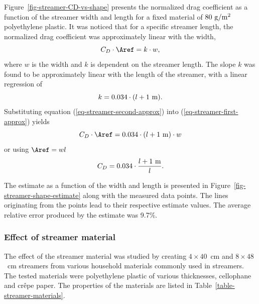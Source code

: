 Figure~\ref{fig-streamer-CD-vs-shape} presents the normalized drag
coefficient as a function of the streamer width and length for a fixed
material of $\rm80~g/m^2$ polyethylene plastic.  It was noticed that
for a specific streamer length, the normalized drag coefficient was
approximately linear with the width,
%
\begin{equation}
C_D \cdot \Aref = k\cdot w,
\label{eq-streamer-first-approx}
\end{equation}
%
where $w$ is the width and $k$ is dependent on the streamer length.
The slope $k$ was found to be approximately linear with
the length of the streamer, with a linear regression of
%
\begin{equation}
k = 0.034 \cdot (l+\rm 1~m).
\label{eq-streamer-second-approx}
\end{equation}
%
Substituting equation (\ref{eq-streamer-second-approx}) into
(\ref{eq-streamer-first-approx}) yields
%
\begin{equation}
C_D \cdot \Aref = 0.034 \cdot (l+{\rm 1~m})\cdot w
\label{eq-streamer-estimate}
\end{equation}
%
or using $\Aref = wl$
%
\begin{equation}
C_D = 0.034 \cdot \frac{l+\rm 1~m}{l}.
\label{eq-streamer-shape-estimate}
\end{equation}


The estimate as a function of the width and length is presented in 
Figure~\ref{fig-streamer-shape-estimate} along with the measured data
points.  The lines originating from the points lead to their
respective estimate values.  The average relative error produced by
the estimate was 9.7\%.


\subsubsection*{Effect of streamer material}



The effect of the streamer material was studied by creating
$4\times40$~cm and $8\times48$~cm streamers from various household
materials commonly used in streamers.  The tested materials were
polyethylene plastic of various thicknesses, cellophane and crêpe
paper.  The properties of the materials are listed in
Table~\ref{table-streamer-materials}. 


